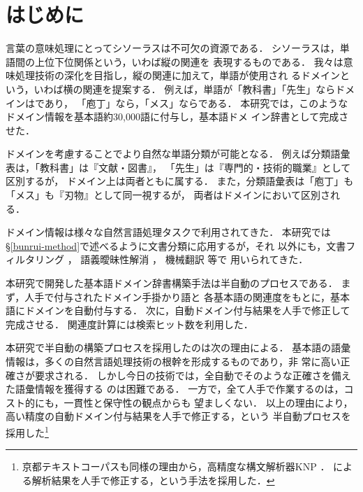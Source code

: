 \documentclass[japanese]{jnlp_1.4}
\newcommand{\dom}[1]{}
\begin{document}
\maketitle


\section{はじめに}

言葉の意味処理にとってシソーラスは不可欠の資源である．
シソーラスは，単語間の上位下位関係という，いわば縦の関連を
表現するものである．
我々は意味処理技術の深化を目指し，縦の関連に加えて，単語が使用され
るドメインという，いわば横の関連を提案する．
例えば，単語が「教科書」「先生」ならドメインは\dom{教育・学習}であり，
「庖丁」なら\dom{料理・食事}，「メス」なら\dom{健康・医学}である．
本研究では，このようなドメイン情報を基本語約30,000語に付与し，基本語ドメ
イン辞書として完成させた．

ドメインを考慮することでより自然な単語分類が可能となる．
例えば分類語彙表は，「教科書」は『文献・図書』，
「先生」は『専門的・技術的職業』として区別するが，
ドメイン上は両者とも\dom{教育・学習}に属する．
また，分類語彙表は「庖丁」も「メス」も『刃物』として同一視するが，
両者はドメインにおいて区別される．

ドメイン情報は様々な自然言語処理タスクで利用されてきた．
本研究では\S\ref{bunrui-method}で述べるように文書分類に応用するが，それ
以外にも，文書フィルタリング
\cite{Liddy:Paik:1993}，
語義曖昧性解消 \cite{Rigau:Atserias:Agirre:1997,Tanaka:Bond:Baldwin:Fujita:Hashimoto:2007}，
機械翻訳 \cite{Yoshimoto:Kinoshita:Shimazu:1997,Lange:Yang:1999}等で
用いられてきた．

本研究で開発した基本語ドメイン辞書構築手法は半自動のプロセスである．
まず，人手で付与されたドメイン手掛かり語と
各基本語の関連度をもとに，基本語にドメインを自動付与する．
次に，自動ドメイン付与結果を人手で修正して完成させる．
関連度計算には検索ヒット数を利用した．

本研究で半自動の構築プロセスを採用したのは次の理由による．
基本語の語彙情報は，多くの自然言語処理技術の根幹を形成するものであり，非
常に高い正確さが要求される．
しかし今日の技術では，全自動でそのような正確さを備えた語彙情報を獲得する
のは困難である．
一方で，全て人手で作業するのは，コスト的にも，一貫性と保守性の観点からも
望ましくない．
以上の理由により，高い精度の自動ドメイン付与結果を人手で修正する，という
半自動プロセスを採用した\footnote{
京都テキストコーパスも同様の理由から，高精度な構文解析器KNP 
\cite{黒橋:長尾:1992}．
による解析結果を人手で修正する，という手法を採用した．
}
\end{document}
